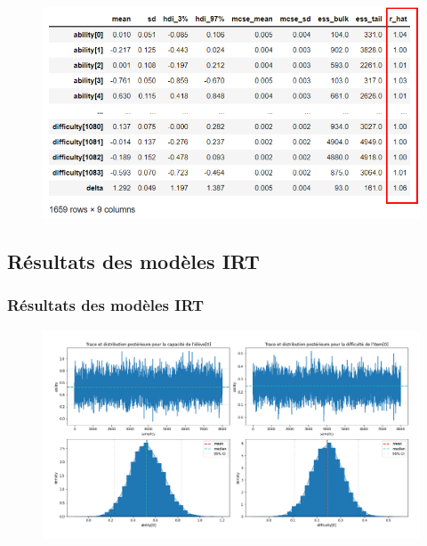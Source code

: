 \documentclass[aspectratio=169,professionalfonts, 12pt]{beamer}
\begin{document}
\begin{frame}
  \justifying 
  \begin{minipage}{\textwidth}
    \begin{figure}[H]
      \begin{center}
        \includegraphics[width=\textwidth]{images/contribution/output_of_rhat.png}
      \end{center}
    \end{figure}
  \end{minipage}
\end{frame}


\subsection{Résultats des modèles IRT}

\begin{frame}
  \frametitle{Résultats des modèles IRT}
  \justifying 
  \begin{minipage}{\textwidth} 
  \begin{figure}[H]
    \begin{center}
      \includegraphics[scale=0.3]{images/contribution/params_posterior_distribution.png}
    \end{center}
  \end{figure}
  \end{minipage}
\end{frame}
\end{document}
